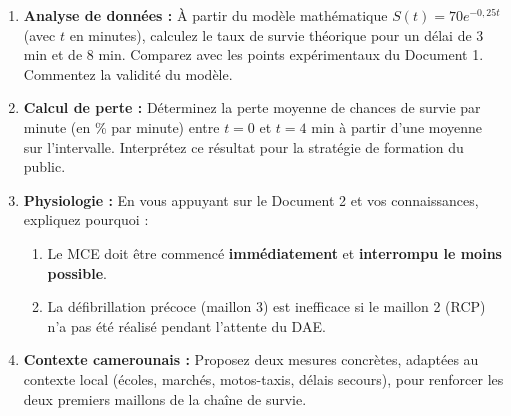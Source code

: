 \documentclass[11pt]{article}
\begin{document}
\begin{exercice}
\begin{enumerate}
    \item \textbf{Analyse de données :} À partir du modèle mathématique $S(t) = 70 e^{-0,25t}$ (avec $t$ en minutes), calculez le taux de survie théorique pour un délai de 3 min et de 8 min. Comparez avec les points expérimentaux du Document 1. Commentez la validité du modèle.
    \item \textbf{Calcul de perte :} Déterminez la perte moyenne de chances de survie par minute (en \% par minute) entre $t=0$ et $t=4$ min à partir d'une moyenne sur l'intervalle. Interprétez ce résultat pour la stratégie de formation du public.
    \item \textbf{Physiologie :} En vous appuyant sur le Document 2 et vos connaissances, expliquez pourquoi :
    \begin{enumerate}
        \item Le MCE doit être commencé \textbf{immédiatement} et \textbf{interrompu le moins possible}.
        \item La défibrillation précoce (maillon 3) est inefficace si le maillon 2 (RCP) n'a pas été réalisé pendant l'attente du DAE.
    \end{enumerate}
    \item \textbf{Contexte camerounais :} Proposez deux mesures concrètes, adaptées au contexte local (écoles, marchés, motos-taxis, délais secours), pour renforcer les deux premiers maillons de la chaîne de survie.
\end{enumerate}
\end{exercice}
\end{document}
